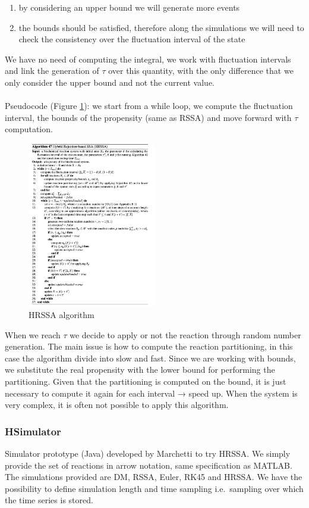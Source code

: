 \begin{enumerate}
  \def\labelenumi{\arabic{enumi}.}
  \item by considering an upper bound we will generate more events
  \item the bounds should be satisfied, therefore along the simulations we will need to check the consistency over the fluctuation interval of the state
\end{enumerate}
\noindent
We have no need of computing the integral, we work with fluctuation intervals and link the generation of $\tau$ over this quantity, with the only difference that we only consider the upper bound and not the current value.
\\
\\
\noindent
Pseudocode (Figure \ref{fig:HRSSA}): we start from a while loop, we compute the fluctuation interval, the bounds of the propensity (same as RSSA) and move forward with $\tau$ computation.
\begin{figure}
  \centering
  \includegraphics[width=0.5\textwidth]{HRSSA.png}
  \caption{HRSSA algorithm}
  \label{fig:HRSSA}
\end{figure}
When we reach $\tau$ we decide to apply or not the reaction through random number generation.
The main issue is how to compute the reaction partitioning, in this case the algorithm divide into slow and fast.
Since we are working with bounds, we substitute the real propensity with the lower bound for performing the partitioning.
Given that the partitioning is computed on the bound, it is just necessary to compute it again for each interval → speed up.
When the system is very complex, it is often not possible to apply this algorithm.

\subsubsection{HSimulator}
Simulator prototype (Java) developed by Marchetti to try HRSSA.
We simply provide the set of reactions in arrow notation, same specification as MATLAB.
The simulations provided are DM, RSSA, Euler, RK45 and HRSSA.
We have the possibility to define simulation length and time sampling i.e.~sampling over which the time series is stored.

